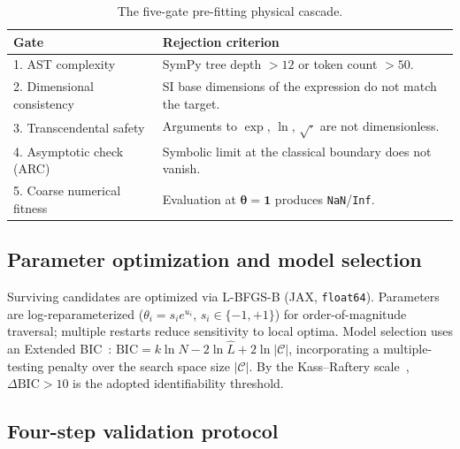 \documentclass{article}
\begin{document}
\begin{table}[ht]
\small
\caption{The five-gate pre-fitting physical cascade.}
\label{tab:gates}
\centering
\begin{tabular}{@{}p{3.5cm}p{9cm}@{}}
\toprule
Gate & Rejection criterion \\
\midrule
1. AST complexity & SymPy tree depth $>12$ or token count $>50$. \\
2. Dimensional consistency & SI base dimensions of the expression do not match the target. \\
3. Transcendental safety & Arguments to $\exp$, $\ln$, $\sqrt{\cdot}$ are not dimensionless. \\
4. Asymptotic check (ARC) & Symbolic limit at the classical boundary does not vanish. \\
5. Coarse numerical fitness & Evaluation at $\boldsymbol{\theta}=\mathbf{1}$ produces \texttt{NaN}/\texttt{Inf}. \\
\bottomrule
\end{tabular}
\end{table}

\subsection{Parameter optimization and model selection}

Surviving candidates are optimized via L-BFGS-B (JAX, \texttt{float64}).
Parameters are log-reparameterized ($\theta_i{=}s_i e^{u_i}$,
$s_i{\in}\{-1,+1\}$) for order-of-magnitude traversal; multiple restarts
reduce sensitivity to local optima.
Model selection uses an Extended BIC~\cite{schwarz1978,chen2008}: $\mathrm{BIC}=k\ln N - 2\ln\hat{L} + 2\ln|\mathcal{C}|$,
incorporating a multiple-testing penalty over the search space size $|\mathcal{C}|$.
By the Kass--Raftery scale~\cite{kass1995}, $\Delta\mathrm{BIC}>10$ is the
adopted identifiability threshold.

\subsection{Four-step validation protocol}
\label{sec:protocol}
\end{document}
